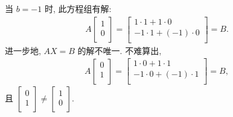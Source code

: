\documentclass[../libro.tex]{subfiles}
\begin{document}
\begin{example}
    当 \(b = -1\) 时, 此方程组有解:
    \begin{align*}
        A
        \begin{bmatrix}
            1 \\
            0 \\
        \end{bmatrix}
        =
        \begin{bmatrix}
            1 \cdot 1 + 1 \cdot 0     \\
            -1 \cdot 1 + (-1) \cdot 0 \\
        \end{bmatrix}
        =
        B.
    \end{align*}
    进一步地, \(AX = B\) 的解不唯一.
    不难算出,
    \begin{align*}
        A
        \begin{bmatrix}
            0 \\
            1 \\
        \end{bmatrix}
        =
        \begin{bmatrix}
            1 \cdot 0 + 1 \cdot 1     \\
            -1 \cdot 0 + (-1) \cdot 1 \\
        \end{bmatrix}
        =
        B,
    \end{align*}
    且
    \(
        \begin{bmatrix}
            0 \\
            1 \\
        \end{bmatrix}
        \neq
        \begin{bmatrix}
            1 \\
            0 \\
        \end{bmatrix}
    \).


\end{example}
\end{document}
